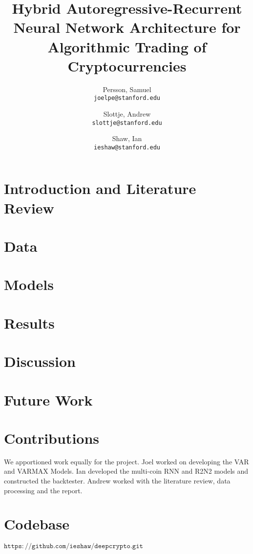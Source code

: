 \documentclass{article}
\title{Hybrid Autoregressive-Recurrent Neural Network Architecture for Algorithmic Trading of Cryptocurrencies}
\author{
  Persson, Samuel\\
  \texttt{joelpe@stanford.edu}
  \and
  Slottje, Andrew\\
  \texttt{slottje@stanford.edu}
  \and
  Shaw, Ian\\
  \texttt{ieshaw@stanford.edu}
}
\begin{document}
\maketitle

\begin{abstract}

\end{abstract}

\section{Introduction and Literature Review}



\section{Data}



\section{Models}



\section{Results}



\section{Discussion}



\section{Future Work}



\section{Contributions}
We apportioned work equally for the project. Joel worked on developing the VAR and VARMAX Models. Ian developed the multi-coin RNN and R2N2 models and constructed the backtester. Andrew worked with the literature review, data processing and the report.

\section{Codebase}
$\mathtt{https://github.com/ieshaw/deepcrypto.git}$


\end{document}
